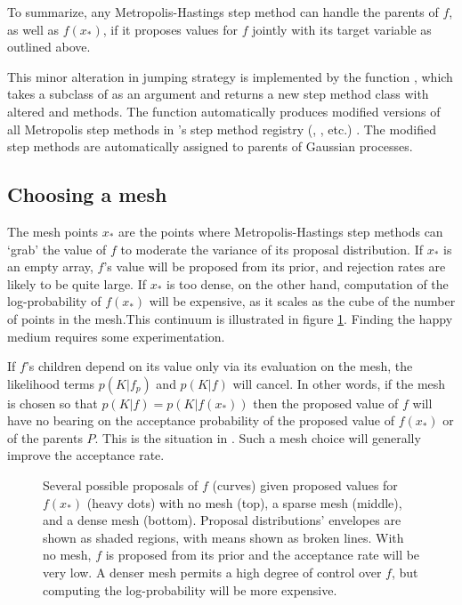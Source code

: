 \smallskip
To summarize, any Metropolis-Hastings step method can handle the parents of $f$, as well as $f(x_*)$, if it proposes values for $f$ jointly with its target variable as outlined above.

This minor alteration in jumping strategy is implemented by the function , which takes a subclass of  as an argument and returns a new step method class with altered  and  methods. The function automatically produces modified versions of all Metropolis step methods in 's step method registry (, , etc.) \citep{pymc}. The modified step methods are automatically assigned to parents of Gaussian processes.

\subsection{Choosing a mesh}

The mesh points $x_*$ are the points where Metropolis-Hastings step methods can `grab' the value of $f$ to moderate the variance of its proposal distribution. If $x_*$ is an empty array, $f$'s value will be proposed from its prior, and rejection rates are likely to be quite large. If $x_*$ is too dense, on the other hand, computation of the log-probability of $f(x_*)$ will be expensive, as it scales as the cube of the number of points in the mesh.This continuum is illustrated in figure \ref{fig:meshpropose}. Finding the happy medium requires some experimentation.

If $f$'s children depend on its value only via its evaluation on the mesh, the likelihood terms $p(K|f_p)$ and $p(K|f)$ will cancel. In other words, if the mesh is chosen so that $p(K|f)=p(K|f(x_*))$ then the proposed value of $f$ will have no bearing on the acceptance probability of the proposed value of $f(x_*)$ or of the parents $P$. This is the situation in . Such a mesh choice will generally improve the acceptance rate.

\begin{figure}
    \centering
    \caption{Several possible proposals of $f$ (curves) given proposed values for $f(x_*)$ (heavy dots) with no mesh (top), a sparse mesh (middle), and a dense mesh (bottom). Proposal distributions' envelopes are shown as shaded regions, with means shown as broken lines. With no mesh, $f$ is proposed from its prior and the acceptance rate will be very low. A denser mesh permits a high degree of control over $f$, but computing the log-probability will be more expensive.}
    \label{fig:meshpropose}
\end{figure}

